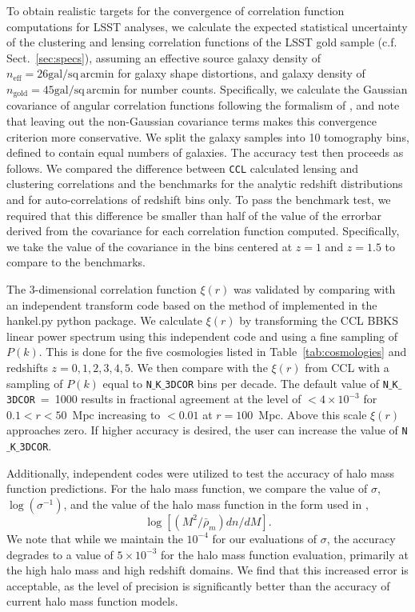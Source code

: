 \documentclass[\docopts]{\docclass}
\newcommand{\ccl}{{\tt CCL}\xspace}
\begin{document}
To obtain realistic targets for the convergence of correlation function computations for LSST analyses, we calculate the expected statistical uncertainty of the clustering and lensing correlation functions of the LSST gold sample (c.f. Sect.~\ref{sec:specs}), assuming an effective source galaxy density of $n_\mathrm{eff} = 26\mathrm{gal/sq\,arcmin}$ for galaxy shape distortions, and galaxy density of $n_\mathrm{gold} = 45\mathrm{gal/sq\,arcmin}$ for number counts. Specifically, we calculate the Gaussian covariance of angular correlation functions following the formalism of \citet{2008A&A...477...43J}, and note that leaving out the non-Gaussian covariance terms makes this convergence criterion more conservative. We split the galaxy samples into 10 tomography bins, defined to contain equal numbers of galaxies. The accuracy test then proceeds as follows. We compared the difference between \ccl calculated lensing and clustering correlations and the benchmarks for the analytic redshift distributions and for auto-correlations of redshift bins only. To pass the benchmark test, we required that this difference be smaller than half of the value of the errorbar derived from the covariance for each correlation function computed. Specifically, we take the value of the covariance in the bins centered at $z=1$ and $z=1.5$ to compare to the benchmarks.


The 3-dimensional correlation function $\xi(r)$ was validated by comparing with an independent transform code based
on the method of \cite{Ogata2005} implemented in the hankel.py python package. We calculate $\xi(r)$ by transforming the CCL
BBKS linear power spectrum using this independent code and using a fine sampling of $P(k)$. This is done for the five cosmologies
listed in Table~\ref{tab:cosmologies} and redshifts $z = 0,1,2,3,4,5$.  We then compare with the $\xi(r)$ from CCL with a sampling of $P(k)$
equal to {\tt N$\_$K$\_$3DCOR} bins per decade. The default value of {\tt N$\_$K$\_$3DCOR}~=~1000 results in fractional agreement
at the level of $<4 \times 10^{-3}$ for $0.1 < r < 50$~Mpc increasing to  $< 0.01 $ at $r = 100$~Mpc. Above this scale $\xi(r)$
approaches zero. If higher accuracy is desired, the user can increase the value of {\tt N$\_$K$\_$3DCOR}.


Additionally, independent codes were utilized to test the accuracy of halo mass function predictions. For the halo mass function, we compare the value of $\sigma$, $\log(\sigma^{-1})$, and the value of the halo mass function in the form used in \cite{Tinker2008},
\begin{equation}
\log[(M^2/\bar{\rho}_m)dn/dM].
\end{equation}
We note that while we maintain the $10^{-4}$ for our evaluations of $\sigma$, the accuracy degrades to a value of $5\times10^{-3}$ for the halo mass function evaluation, primarily at the high halo mass and high redshift domains. We find that this increased error is acceptable, as the level of precision is significantly better than the accuracy of current halo mass function models.
\end{document}

